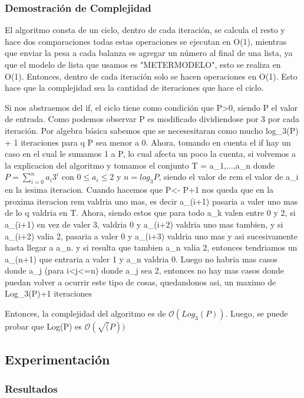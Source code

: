 \documentclass[spanish,12pt]{article}
\begin{document}
\subsubsection{Demostración de Complejidad}

El algoritmo consta de un ciclo, dentro de cada iteración, se calcula el resto y hace dos comparaciones todas estas operaciones se ejecutan en O(1), mientras que enviar la pesa a cada balanza
es agregar un número al final de una lista, ya que el modelo de lista que usamos es "METERMODELO", esto se realiza en O(1).
Entonces, dentro de cada iteración solo se hacen operaciones en O(1). Esto hace que la complejidad sea la cantidad de iteraciones que hace el ciclo.

Si nos abstraemos del if, el ciclo tiene como condición que P>0, siendo P el valor de entrada. Como podemos observar P es modificado dividiendose por 3 por cada iteración. Por algebra básica sabemos que se necesesitaran como mucho log_3(P) + 1 iteraciones para q P sea menor a 0.
Ahora, tomando en cuenta el if hay un caso en el cual le sumamos 1 a P, lo cual afecta un poco la cuenta, si volvemos a la explicacion del algoritmo y tomamos el conjunto T = {a_1,...,a_n}
donde  $P = \sum_{i=0}^{n} a_i3^i$  con $0 \leq a_i \leq 2$ y $n = log_{3}{P}$, siendo el valor de rem el valor de a_i en la iesima iteracion.
Cuando hacemos que P<- P+1 nos queda que en la proxima iteracion rem valdria uno mas, es decir a_(i+1) pasaria a valer uno mas de lo q valdria en T. Ahora,  siendo estos que para todo a_k
valen entre 0 y 2, si a_(i+1) en vez de valer 3, valdria 0 y a_(i+2) valdria uno mas tambien, y si  a_(i+2) valia 2, pasaria a valer 0 y  a_(i+3) valdria uno mas y asi sucesivamente hasta llegar a a_n.
y si resulta que tambien a_n valia 2, entonces tendriamos un a_(n+1) que entraria a valer 1 y a_n valdria 0.
Luego no habria mas casos donde a_j (para i<j<=n) donde a_j sea 2, entonces no hay mas casos donde puedan volver a ocurrir este tipo de cosas, quedandonos asi, un maximo de Log_3(P)+1 iteraciones

Entonces, la complejidad del algoritmo es de $\mathcal{O}(Log_{3}(P))$.
Luego, se puede probar que Log(P) es $\mathcal{O}(\sqrt(P))$


\subsection{Experimentación}

\subsubsection{Resultados}
\end{document}
